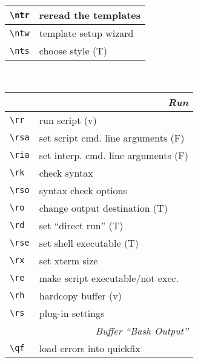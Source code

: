 \documentclass[oneside,11pt,landscape,DIV16]{scrartcl}
\begin{document}
\begin{multicols}{3}
\begin{center}
\begin{tabular}[]{|p{11mm}|p{60mm}|}
\hline \verb'\ntr' & reread the templates      \\
\hline \verb'\ntw' & template setup wizard     \\
\hline \verb'\nts' & choose style              \hfill (T)\\
\hline
\end{tabular}\\
%
\newpage
%
%
\begin{tabular}[]{|p{11mm}|p{60mm}|}
\hline
\multicolumn{2}{|r|}{\textsl{\textbf{R}un}} \\[1.0ex]
\hline \verb'\rr'  & run script                           \hfill (v)\\
\hline \verb'\rsa' & set script cmd. line arguments       \hfill (F)\\
\hline \verb'\ria' & set interp. cmd. line arguments      \hfill (F)\\
\hline \verb'\rk'  & check syntax                         \\
\hline \verb'\rso' & syntax check options                 \\
\hline \verb'\ro'  & change output destination            \hfill (T)\\
\hline \verb'\rd'  & set ``direct run''                   \hfill (T)\\
\hline \verb'\rse' & set shell executable                 \hfill (T)\\
\hline \verb'\rx'  & set xterm size                       \\
\hline \verb'\re'  & make script executable/not exec.     \\
\hline \verb'\rh'  & hardcopy buffer                      \hfill (v)\\
\hline \verb'\rs'  & plug-in settings                     \\
\hline
\hline
\multicolumn{2}{|r|}{\textsl{Buffer ``Bash Output''}} \\[1.0ex]
\hline \verb'\qf'  & load errors into quickfix             \\

\end{tabular}
\end{center}
\end{multicols}
\end{document}
